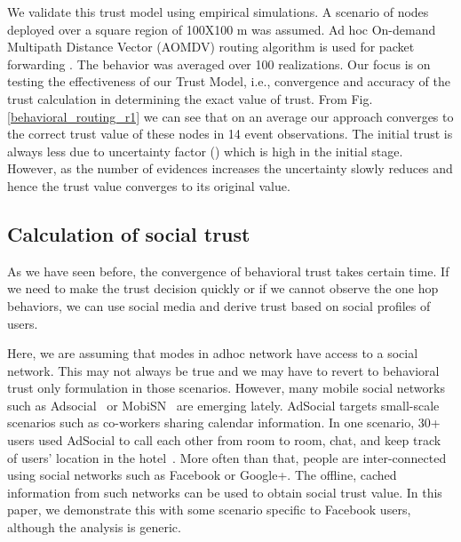 \documentclass[conference]{IEEEtran}
\begin{document}
We validate this trust model using empirical simulations. A scenario of  nodes deployed over a square region of 100X100 m was assumed.  Ad hoc On-demand Multipath Distance Vector (AOMDV) routing algorithm is used for packet forwarding \cite{marina2002ad}. The behavior was averaged over 100 realizations. Our focus is on testing the effectiveness of our Trust Model, i.e., convergence and accuracy of the trust
calculation in determining the exact value of trust. From Fig. \ref{behavioral_routing_r1} we can see that on an average our approach converges to the correct trust value of these nodes in 14 event observations. The initial trust is always less due to uncertainty factor () which is high in the initial stage. However, as the number of evidences increases the uncertainty slowly reduces and hence the trust value converges to its original value.




\subsection{Calculation of social trust}
As we have seen before, the convergence of behavioral trust takes certain time. If we need to make the trust decision quickly or if we cannot observe the one hop behaviors, we can use social media and derive trust based on social profiles of users.

Here, we are assuming that modes in adhoc network have access to a social network. This may not always be true and we may have to revert to behavioral trust only formulation in those scenarios. However, many mobile social networks such as Adsocial~\cite{sarigl09} or MobiSN~\cite{li09mobisn} are emerging lately. AdSocial targets small-scale scenarios such as  co-workers sharing calendar information. In one scenario, 30+ users used AdSocial to call each other from room to room, chat, and keep track of users’ location in the hotel~\cite{sarigl09}. More often than that, people are inter-connected using social networks such as Facebook or Google+. The offline, cached information from such networks can be used to obtain social trust value. In this paper, we demonstrate this with some scenario specific to Facebook users, although the analysis is generic.
\end{document}
